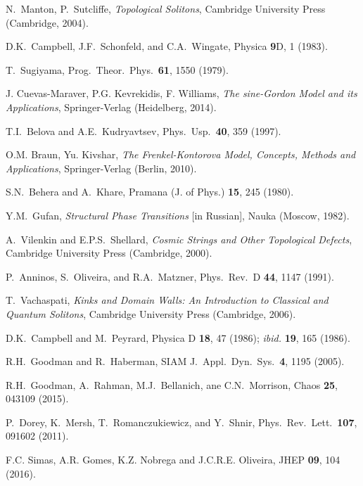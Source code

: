 \documentclass[vecphys]{svmult}		%
\begin{document}
{\begin{thebibliography}{99.}




N.~Manton, P.~Sutcliffe, {\it Topological Solitons}, Cambridge University Press (Cambridge, 2004).

 D.K.~Campbell, J.F.~Schonfeld, and C.A.~Wingate,
Physica {\bf 9}D, 1 (1983).

 T.~Sugiyama,  Prog.\ Theor.\ Phys.\ {\bf 61}, 1550 (1979).

 J. Cuevas-Maraver, P.G. Kevrekidis, F. Williams,
  {\it The sine-Gordon Model and its Applications},
  Springer-Verlag (Heidelberg, 2014).


 T.I.~Belova and A.E.~Kudryavtsev,
Phys.\ Usp.\ {\bf 40}, 359 (1997).

 O.M. Braun, Yu. Kivshar,
  {\it The Frenkel-Kontorova Model, Concepts, Methods and Applications},
  Springer-Verlag (Berlin, 2010).


S.N.~Behera and A.~Khare, Pramana (J. of Phys.) {\bf 15}, 245 (1980). 


Y.M.~Gufan, {\it Structural Phase Transitions} [in Russian], Nauka (Moscow, 1982).

A.~Vilenkin and E.P.S.~Shellard, \textit{Cosmic Strings and Other Topological Defects}, Cambridge University Press (Cambridge, 2000).

 P.~Anninos, S.~Oliveira, and R.A.~Matzner,
Phys.\ Rev.\ D {\bf 44}, 1147 (1991).

T.~Vachaspati, {\it Kinks and Domain Walls: An Introduction to Classical and Quantum Solitons}, Cambridge University Press (Cambridge, 2006). 


 D.K.~Campbell and M.~Peyrard,
Physica D {\bf 18}, 47 (1986); {\it ibid.} {\bf 19}, 165 (1986).

 R.H.~Goodman and R.~Haberman,
SIAM J.\ Appl.\ Dyn.\ Sys.\ {\bf 4}, 1195 (2005).

 R.H.~Goodman, A.~Rahman, M.J.~Bellanich, ane C.N.~Morrison,
  Chaos {\bf 25}, 043109 (2015).

 P.~Dorey, K.~Mersh, T.~Romanczukiewicz, and Y.~Shnir,
  Phys.\ Rev.\ Lett.\ {\bf 107}, 091602 (2011).

 F.C. Simas, A.R. Gomes, K.Z. Nobrega and
  J.C.R.E. Oliveira,
  JHEP {\bf 09}, 104 (2016).


\end{thebibliography}}
\end{document}
